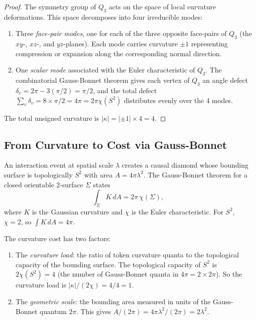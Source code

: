 \documentclass[12pt]{article}
\theoremstyle{definition}
\theoremstyle{remark}
\begin{document}
\begin{proof}
The symmetry group of $Q_3$ acts on the space of local curvature
deformations. This space decomposes into four irreducible modes:
\begin{enumerate}[label=(\roman*)]
  \item Three \emph{face-pair modes}, one for each of the three
    opposite face-pairs of $Q_3$ (the $xy$-, $xz$-, and $yz$-planes).
    Each mode carries curvature $\pm 1$ representing compression or
    expansion along the corresponding normal direction.
  \item One \emph{scalar mode} associated with the Euler
    characteristic of $Q_3$. The combinatorial Gauss-Bonnet theorem
    gives each vertex of $Q_3$ an angle defect
    $\delta_v = 2\pi - 3(\pi/2) = \pi/2$, and the total defect
    $\sum_v \delta_v = 8 \times \pi/2 = 4\pi = 2\pi\chi(S^2)$
    distributes evenly over the 4 modes.
\end{enumerate}
The total unsigned curvature is $|\kappa| = |{\pm 1}| \times 4 = 4$.
\end{proof}

\subsection{From Curvature to Cost via Gauss-Bonnet}

An interaction event at spatial scale $\lambda$ creates a causal diamond
whose bounding surface is topologically $S^2$ with area
$A = 4\pi\lambda^2$. The Gauss-Bonnet theorem for a closed orientable
2-surface $\Sigma$ states
\begin{equation}
  \int_\Sigma K\,dA = 2\pi\,\chi(\Sigma),
\end{equation}
where $K$ is the Gaussian curvature and $\chi$ is the Euler
characteristic. For $S^2$, $\chi = 2$, so
$\int K\,dA = 4\pi$.

The curvature cost has two factors:
\begin{enumerate}[label=(\roman*)]
  \item The \emph{curvature load}: the ratio of token curvature quanta
    to the topological capacity of the bounding surface. The
    topological capacity of $S^2$ is $2\chi(S^2) = 4$ (the number of
    Gauss-Bonnet quanta in $4\pi = 2 \times 2\pi$). So the curvature
    load is $|\kappa|/(2\chi) = 4/4 = 1$.
  \item The \emph{geometric scale}: the bounding area measured in units
    of the Gauss-Bonnet quantum $2\pi$. This gives
    $A/(2\pi) = 4\pi\lambda^2/(2\pi) = 2\lambda^2$.
\end{enumerate}
\end{document}

